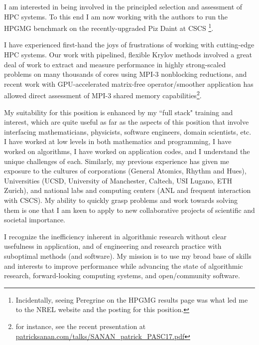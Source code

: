\documentclass{letter}
\begin{document}
\begin{letter}{}
I am interested in being involved in the principled selection and assessment of HPC systems. To this end I am now working with the authors to run the HPGMG benchmark on the recently-upgraded Piz Daint at CSCS \footnote{Incidentally, seeing Peregrine on the HPGMG results page was what led me to the NREL website and the posting for this position.}.

  I have experienced first-hand the joys of frustrations of working with cutting-edge HPC systems. Our work with pipelined, flexible Krylov methods involved a great deal of work to extract and measure performance in highly strong-scaled problems on many thousands of cores using MPI-3 nonblocking reductions, and recent work with GPU-accelerated matrix-free operator/smoother application has allowed direct assessment of MPI-3 shared memory capabilities\footnote{for instance, see the recent presentation at \href{http://www.patricksanan.com/talks/SANAN_patrick_PASC17.pdf}{patricksanan.com/talks/SANAN\_patrick\_PASC17.pdf}}.





My suitability for this position is enhanced by my ``full stack" training and interest, which are quite useful as far as the aspects of this position that involve interfacing mathematicians, physicists, software engineers, domain scientists, etc. I have worked at low levels in both mathematics and programming, I have worked on algorithms, I have worked on application codes, and I understand the unique challenges of each.
Similarly, my previous experience has given me exposure to the cultures of corporations (General Atomics, Rhythm and Hues), Universities (UCSD, University of Manchester, Caltech, USI Lugano, ETH Zurich), and national labs and computing centers (ANL and frequent interaction with CSCS).
  My ability to quickly grasp problems and work towards solving them is one that I am keen to apply to new collaborative projects of scientific and societal importance.

  I recognize the inefficiency inherent in algorithmic research without clear usefulness in application, and of engineering and research practice with suboptimal methods (and software). My mission is to use my broad base of skills and interests to improve performance while advancing the state of algorithmic research, forward-looking computing systems, and open/community software.


\end{letter}
\end{document}
